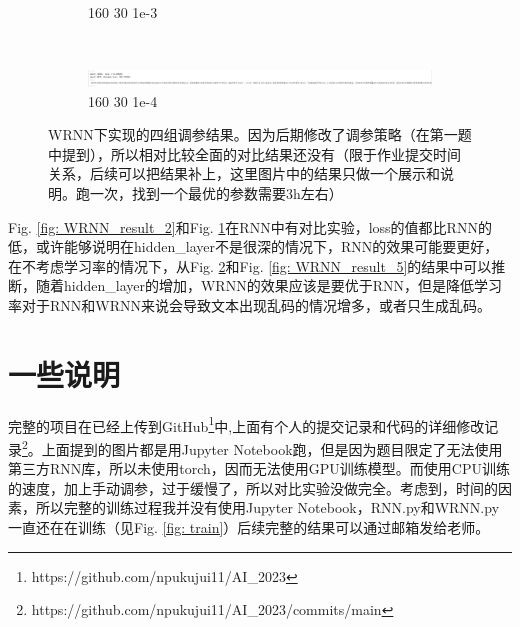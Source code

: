 \documentclass[letterpaper,12pt]{article}
\begin{document}
\begin{figure}[htbp]
\begin{subfigure}{\textwidth}
			\captionsetup{font=scriptsize}
			\caption{160 30 1e-3}
			\label{fig: WRNN_result_3}	
		\end{subfigure} \\
		\begin{subfigure}{\textwidth}
			\includegraphics[width=\linewidth]{WRNN/result_4}
			\captionsetup{font=scriptsize}
			\caption{160 30 1e-4}
			\label{fig: WRNN_result_4}	
		\end{subfigure}
		\captionsetup{font=scriptsize}
		\caption{
			\label{fig: WRNN_result} %
			WRNN下实现的四组调参结果。因为后期修改了调参策略（在第一题中提到），所以相对比较全面的对比结果还没有（限于作业提交时间关系，后续可以把结果补上，这里图片中的结果只做一个展示和说明。跑一次，找到一个最优的参数需要3h左右）
		}
	\end{figure}
	
	Fig. \ref{fig: WRNN_result_2}和Fig. \ref{fig: WRNN_result_3}在RNN中有对比实验，loss的值都比RNN的低，或许能够说明在hidden\_layer不是很深的情况下，RNN的效果可能要更好，在不考虑学习率的情况下，从Fig. \ref{fig: WRNN_result_4}和Fig. \ref{fig: WRNN_result_5}的结果中可以推断，随着hidden\_layer的增加，WRNN的效果应该是要优于RNN，但是降低学习率对于RNN和WRNN来说会导致文本出现乱码的情况增多，或者只生成乱码。

	\section{一些说明}
	
	完整的项目在已经上传到GitHub\footnote{https://github.com/npukujui11/AI\_2023}中,上面有个人的提交记录和代码的详细修改记录\footnote{https://github.com/npukujui11/AI\_2023/commits/main}。上面提到的图片都是用Jupyter Notebook跑，但是因为题目限定了无法使用第三方RNN库，所以未使用torch，因而无法使用GPU训练模型。而使用CPU训练的速度，加上手动调参，过于缓慢了，所以对比实验没做完全。考虑到，时间的因素，所以完整的训练过程我并没有使用Jupyter Notebook，RNN.py和WRNN.py一直还在在训练（见Fig. \ref{fig: train}）后续完整的结果可以通过邮箱发给老师。
	
\end{document}
